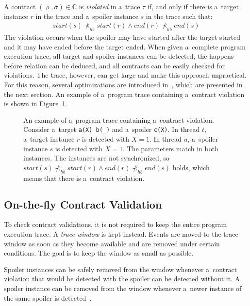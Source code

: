 A contract $(\varrho,\sigma) \in \mathbb{C}$ is \emph{violated} in a~trace
$\tau$ if, and only if there is a~target instance $r$ in the trace and a~spoiler
instance $s$ in the trace such that:
\begin{align*}
    start(s) \nprec_{hb} start(r) \wedge end(r) \nprec_{hb} end(s)
\end{align*}
The violation occurs when the spoiler may have started after the target started
and it may have ended before the target ended. When given a~complete program
execution trace, all target and spoiler instances can be detected, the
happens-before relation can be deduced, and all contracts can be easily checked
for violations. The trace, however, can get large and make this approach
unpractical. For this reason, several optimizations are introduced
in~\cite{contracts}, which are presented in the next section. An example of
a~program trace containing a~contract violation is shown in Figure~\ref{traces}.

\begin{figure}[hbt]
    \begin{center}
        \label{traces}
        
        \caption{An example of a~program trace containing a~contract violation.
        Consider a~target \texttt{a(X) b(\_)} and a~spoiler \texttt{c(X)}. In
        thread $t$, a~target instance $r$ is detected with $X=1$. In thread $u$,
        a~spoiler instance $s$ is detected with $X=1$. The parameters match in
        both instances. The instances are not synchronized, so $start(s)
        \nprec_{hb} start(r) \wedge end(r) \nprec_{hb} end(s)$ holds, which
        means that there is a~contract violation.}
    \end{center}
\end{figure}

\subsection{On-the-fly Contract Validation}

To check contract validations, it is not required to keep the entire program
execution trace. A \emph{trace window} is kept instead. Events are moved to the
trace window as soon as they become available and are removed under certain
conditions. The goal is to keep the window as small as possible.

Spoiler instances can be safely removed from the window whenever a~contract
violation that would be detected with the spoiler can be detected without it. A
spoiler instance can be removed from the window whenever a~newer instance of the
same spoiler is detected~\cite{contracts}.

